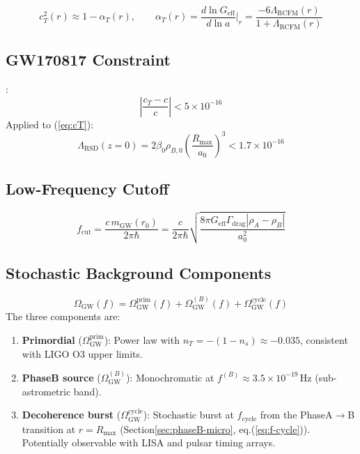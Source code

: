\documentclass[10pt,twocolumn]{article}
\theoremstyle{definition}
\newcommand{\Rmax}{R_{\max}}
\newcommand{\rhoA}{\rho_{A}}
\newcommand{\rhoB}{\rho_{B}}
\newcommand{\Geff}{G_{\mathrm{eff}}}
\newcommand{\Gammadrag}{\Gamma_{\mathrm{drag}}}
\begin{document}
\begin{equation}
  c_{T}^{2}(r)
    \approx 1-\alpha_{T}(r),
  \qquad
  \alpha_{T}(r)
    = \frac{d\ln\Geff}{d\ln a}\bigg|_{r}
    = \frac{-6\Lambda_{\mathrm{RCFM}}(r)}
           {1+\Lambda_{\mathrm{RCFM}}(r)}
  \label{eq:cT}
\end{equation}

\subsection{GW170817 Constraint}

\citep{Abbott2017GW}:
\begin{equation}
  \left|\frac{c_{T}-c}{c}\right| < 5\times10^{-16}
\end{equation}
Applied to (\ref{eq:cT}):
\begin{equation}
  \Lambda_{\mathrm{RSD}}(z=0)
    = 2\beta_{0}\rho_{B,0}\left(\frac{\Rmax}{a_{0}}\right)^{3}
    < 1.7\times10^{-16}
  \label{eq:GW-constraint}
\end{equation}


\subsection{Low-Frequency Cutoff}

\begin{equation}
  f_{\mathrm{cut}}
    = \frac{c\,m_{\mathrm{GW}}(r_{0})}{2\pi\hbar}
    = \frac{c}{2\pi\hbar}
      \sqrt{\frac{8\pi\Geff\Gammadrag|\rhoA-\rhoB|}{a_{0}^{2}}}
  \label{eq:f-cut}
\end{equation}

\subsection{Stochastic Background Components}

\begin{equation}
  \Omega_{\mathrm{GW}}(f)
    = \Omega_{\mathrm{GW}}^{\mathrm{prim}}(f)
    + \Omega_{\mathrm{GW}}^{(B)}(f)
    + \Omega_{\mathrm{GW}}^{\mathrm{cycle}}(f)
  \label{eq:Omega-GW}
\end{equation}
The three components are:
\begin{enumerate}[label=(\roman*)]
  \item \textbf{Primordial} (\( \Omega_{\mathrm{GW}}^{\mathrm{prim}} \)):
    Power law with \( n_{T}=-(1-n_{s})\approx-0.035 \),
    consistent with LIGO O3 upper limits.
  \item \textbf{Phase\nobreakspace{}B source} (\( \Omega_{\mathrm{GW}}^{(B)} \)):
    Monochromatic at $f^{(B)}\approx3.5\times10^{-19}\,
    \mathrm{Hz}$ (sub-astrometric band).
  \item \textbf{Decoherence burst} (\( \Omega_{\mathrm{GW}}^{\mathrm{cycle}} \)):
    Stochastic burst at \( f_{\mathrm{cycle}} \) from the
    Phase\nobreakspace{}A$\to$B transition at \( r=\Rmax \)
    (Section\nobreakspace{}\ref{sec:phaseB-micro}, eq.\nobreakspace{}(\ref{eq:f-cycle})).
    Potentially observable with LISA and pulsar timing
    arrays.
\end{enumerate}
\end{document}
